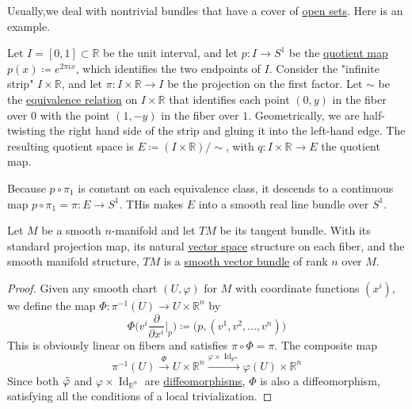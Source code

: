 \documentclass{article}
\DeclareMathOperator{\Id}{Id}
\newcounter{theorem}[section]
\newcounter{example}[section]
\begin{document}
  Usually,we deal with nontrivial bundles that have a cover of \hyperref[pst-def:open-set]{open sets}. Here is an example. 

  \begin{example}
    \label{ex:mobius-bundle}
  Let $I = [0,1] \subset \mathbb{R}$ be the unit interval, and let $p: I \to S^1$ be the \hyperref[pst-def:quotient-map]{quotient map} $p(x) \coloneqq e^{2 \pi i x}$, which identifies the two endpoints of $I$. Consider the "infinite strip" $I \times \mathbb{R}$, and let $\pi: I \times \mathbb{R} \to I$ be the projection on the first factor. Let $\sim$ be the \hyperref[st-def:equivalence_relation]{equivalence relation} on $I \times \mathbb{R}$ that identifies each point $(0,y)$ in the fiber over $0$ with the point $(1, -y)$ in the fiber over $1$. Geometrically, we are half-twisting the right hand side of the strip and gluing it into the left-hand edge. The resulting quotient space is $E \coloneqq (I \times \mathbb{R})/ \sim$, with $q: I \times \mathbb{R} \to E$ the quotient map. 

  Because $p \circ \pi_1$ is constant on each equivalence class, it descends to a continuous map $p \circ \pi_1 = \pi: E \to S^1$. THis makes $E$ into a smooth real line bundle over $S^1$. 
  \end{example}

  \begin{theorem}
    \label{thm:the-tangent-bundle-as-a-vector-bundle}
  Let $M$ be a smooth $n$-manifold and let $TM$ be its tangent bundle. With its standard projection map, its natural \hyperref[lin-def:vector-space]{vector space} structure on each fiber, and the smooth manifold structure, $TM$ is a \hyperref[def:smooth-vector-bundle]{smooth vector bundle} of rank $n$ over $M$. 
  \end{theorem}
  \begin{proof}
  Given any smooth chart $(U, \varphi)$ for $M$ with coordinate functions $(x^i)$, we define the map $\Phi: \pi^{-1} (U) \to U \times \mathbb{R}^n$ by 
  \begin{equation}
    \Phi \bigg( v^i \frac{\partial}{\partial x^i} \bigg|_p \bigg) \coloneqq \big( p, (v^1, v^2, ..., v^n)\big)
  \end{equation}
  This is obviously linear on fibers and satisfies $\pi \circ \Phi = \pi$. The composite map 
  \begin{equation}
    \pi^{-1} (U) \xrightarrow{\Phi} U \times \mathbb{R}^n \xrightarrow{\varphi \times \Id_{\mathbb{R}^n}} \varphi(U) \times \mathbb{R}^n
  \end{equation}
  Since both $\Tilde{\varphi}$ and $\varphi \times \Id_{\mathbb{R}^n}$ are \hyperref[def:diffeomorphism-2]{diffeomorphisms}, $\Phi$ is also a diffeomorphism, satisfying all the conditions of a local trivialization. 
  \end{proof}
\end{document}
